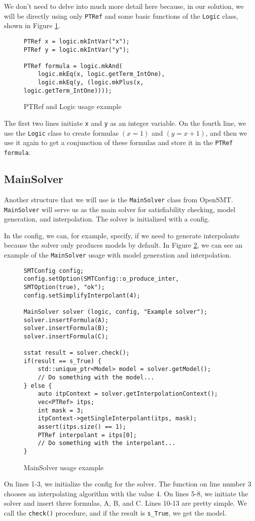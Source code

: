 We don't need to delve into much more detail here because, in our solution, we
will be directly using only \texttt{PTRef} and some basic functions of the
\texttt{Logic} class, shown in Figure \ref{ex:PTref}.

\renewcommand{\figurename}{Figure}
\lstset{style=cppstyle}
\begin{figure}[h]
\begin{lstlisting}
PTRef x = logic.mkIntVar("x");
PTRef y = logic.mkIntVar("y");

PTRef formula = logic.mkAnd(
    logic.mkEq(x, logic.getTerm_IntOne),
    logic.mkEq(y, (logic.mkPlus(x, logic.getTerm_IntOne))));
\end{lstlisting}
\caption{PTRef and Logic usage example}\label{ex:PTref}
\end{figure}
The first two lines initiate \texttt{x} and \texttt{y} as an integer variable.
On the fourth line, we use the \texttt{Logic} class to create formulas $(x =
1)$ and $(y = x + 1)$, and then we use it again to get a conjunction of these
formulas and store it in the \texttt{PTRef formula}.

\subsection{MainSolver}
\noindent Another structure that we will use is the \texttt{MainSolver} class
from OpenSMT. \texttt{MainSolver} will serve us as the main solver for
satisfiability checking, model generation, and interpolation. The solver is
initialized with a config.

In the config, we can, for example, specify, if we need to generate
interpolants because the solver only produces models by default. In Figure
\ref{ex:MainSolver}, we can see an example
of the \texttt{MainSolver} usage with model generation and interpolation.

\begin{figure}[h]
\begin{lstlisting}
SMTConfig config;
config.setOption(SMTConfig::o_produce_inter, SMTOption(true), "ok");
config.setSimplifyInterpolant(4);

MainSolver solver (logic, config, "Example solver");
solver.insertFormula(A);
solver.insertFormula(B);
solver.insertFormula(C);

sstat result = solver.check();
if(result == s_True) {
    std::unique_ptr<Model> model = solver.getModel();
    // Do something with the model...
} else {
    auto itpContext = solver.getInterpolationContext();
    vec<PTRef> itps;
    int mask = 3;
    itpContext->getSingleInterpolant(itps, mask);
    assert(itps.size() == 1);
    PTRef interpolant = itps[0];
    // Do something with the interpolant...
}
\end{lstlisting}
\caption{MainSolver usage example}\label{ex:MainSolver}
\end{figure}
On lines 1-3, we initialize the config for the solver. The function on line
number 3 chooses an interpolating algorithm with the value 4. On lines 5-8, we
initiate the solver and insert three formulas, A, B, and C. Lines 10-13 are
pretty simple. We call the \texttt{check()} procedure, and if the result is
\texttt{s\_True}, we get the model.


